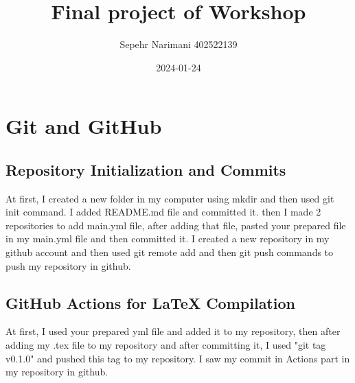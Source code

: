 \documentclass[titlepage]{article}
\title{Final project of Workshop}
\author{Sepehr Narimani 402522139}
\date{2024-01-24}
\begin{document}
	\maketitle
	\pagestyle{fancy}
	
	\section{Git and GitHub}
	\subsection{Repository Initialization and Commits}
	At first, I created a new folder in my computer using mkdir and then used git init command. I added README.md file and committed it. then I made 2 repositories to  add main.yml file, after adding that file, pasted your prepared file in my main.yml file and then committed it. I created a new repository in my github account and then used git remote add and then git push commands to push my repository in github.
	\subsection{ GitHub Actions for LaTeX Compilation}
	At first, I used your prepared yml file and added it to my repository, then after adding my .tex file to my repository and after committing it, I used "git tag v0.1.0" and pushed this tag to my repository. I saw my commit in Actions part in my repository in github.
	
	
\end{document}

